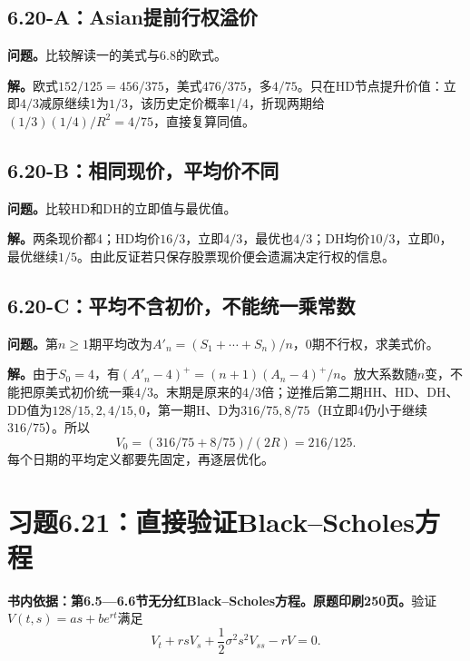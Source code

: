 \documentclass[11pt,a4paper,UTF8,fontset=fandol]{ctexart}
\begin{document}
\endgroup

\subsection{6.20-A：Asian提前行权溢价}\label{aasianux63d0ux524dux884cux6743ux6ea2ux4ef7}

\textbf{问题。}比较解读一的美式与6.8的欧式。

\textbf{解。}欧式\(152/125=456/375\)，美式\(476/375\)，多\(\boxed{4/75}\)。只在HD节点提升价值：立即\(4/3\)减原继续1为\(1/3\)，该历史定价概率1/4，折现两期给\((1/3)(1/4)/R^2=4/75\)，直接复算同值。

\subsection{6.20-B：相同现价，平均价不同}\label{bux76f8ux540cux73b0ux4ef7ux5e73ux5747ux4ef7ux4e0dux540c}

\textbf{问题。}比较HD和DH的立即值与最优值。

\textbf{解。}两条现价都4；HD均价\(16/3\)，立即\(4/3\)，最优也\(4/3\)；DH均价\(10/3\)，立即0，最优继续\(1/5\)。由此反证若只保存股票现价便会遗漏决定行权的信息。

\subsection{6.20-C：平均不含初价，不能统一乘常数}\label{cux5e73ux5747ux4e0dux542bux521dux4ef7ux4e0dux80fdux7edfux4e00ux4e58ux5e38ux6570}

\textbf{问题。}第\(n\ge1\)期平均改为\(A'_n=(S_1+\cdots+S_n)/n\)，0期不行权，求美式价。

\textbf{解。}由于\(S_0=4\)，有\((A'_n-4)^+=(n+1)(A_n-4)^+/n\)。放大系数随\(n\)变，不能把原美式初价统一乘\(4/3\)。末期是原来的\(4/3\)倍；逆推后第二期HH、HD、DH、DD值为\(128/15,2,4/15,0\)，第一期H、D为\(316/75,8/75\)（H立即4仍小于继续\(316/75\)）。所以
\[\boxed{V_0=(316/75+8/75)/(2R)=216/125.}\]
每个日期的平均定义都要先固定，再逐层优化。

\bigskip

\section{习题6.21：直接验证Black--Scholes方程}\label{ux4e60ux98986.21ux76f4ux63a5ux9a8cux8bc1blackscholesux65b9ux7a0b}

\textbf{书内依据：第6.5---6.6节无分红Black--Scholes方程。原题印刷250页。}验证\(V(t,s)=as+be^{rt}\)满足
\[V_t+rsV_s+\frac12\sigma^2s^2V_{ss}-rV=0.\]
\end{document}

